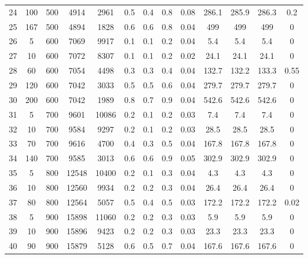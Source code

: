 \documentclass[11pt]{article}
\begin{document}
\begin{landscape}
\begin{longtable}[c]{ccccc|cccc|cccc}
			\rowcolor[HTML]{EFEFEF} 
			24 & 100 & 500 & 4914  & 2961  & 0.5 & 0.4 & 0.8 & 0.08 & 286.1 & 285.9 & 286.3 & 0.2  \\
			\rowcolor[HTML]{EFEFEF} 
			25 & 167 & 500 & 4894  & 1828  & 0.6 & 0.6 & 0.8 & 0.04 & 499   & 499   & 499   & 0    \\
			26 & 5   & 600 & 7069  & 9917  & 0.1 & 0.1 & 0.2 & 0.04 & 5.4   & 5.4   & 5.4   & 0    \\
			27 & 10  & 600 & 7072  & 8307  & 0.1 & 0.1 & 0.2 & 0.02 & 24.1  & 24.1  & 24.1  & 0    \\
			28 & 60  & 600 & 7054  & 4498  & 0.3 & 0.3 & 0.4 & 0.04 & 132.7 & 132.2 & 133.3 & 0.55 \\
			29 & 120 & 600 & 7042  & 3033  & 0.5 & 0.5 & 0.6 & 0.04 & 279.7 & 279.7 & 279.7 & 0    \\
			30 & 200 & 600 & 7042  & 1989  & 0.8 & 0.7 & 0.9 & 0.04 & 542.6 & 542.6 & 542.6 & 0    \\
			\rowcolor[HTML]{EFEFEF} 
			31 & 5   & 700 & 9601  & 10086 & 0.2 & 0.1 & 0.2 & 0.03 & 7.4   & 7.4   & 7.4   & 0    \\
			\rowcolor[HTML]{EFEFEF} 
			32 & 10  & 700 & 9584  & 9297  & 0.2 & 0.1 & 0.2 & 0.03 & 28.5  & 28.5  & 28.5  & 0    \\
			\rowcolor[HTML]{EFEFEF} 
			33 & 70  & 700 & 9616  & 4700  & 0.4 & 0.3 & 0.5 & 0.04 & 167.8 & 167.8 & 167.8 & 0    \\
			\rowcolor[HTML]{EFEFEF} 
			34 & 140 & 700 & 9585  & 3013  & 0.6 & 0.6 & 0.9 & 0.05 & 302.9 & 302.9 & 302.9 & 0    \\
			35 & 5   & 800 & 12548 & 10400 & 0.2 & 0.1 & 0.3 & 0.04 & 4.3   & 4.3   & 4.3   & 0    \\
			36 & 10  & 800 & 12560 & 9934  & 0.2 & 0.2 & 0.3 & 0.04 & 26.4  & 26.4  & 26.4  & 0    \\
			37 & 80  & 800 & 12564 & 5057  & 0.5 & 0.4 & 0.5 & 0.03 & 172.2 & 172.2 & 172.2 & 0.02 \\
			\rowcolor[HTML]{EFEFEF} 
			38 & 5   & 900 & 15898 & 11060 & 0.2 & 0.2 & 0.3 & 0.03 & 5.9   & 5.9   & 5.9   & 0    \\
			\rowcolor[HTML]{EFEFEF} 
			39 & 10  & 900 & 15896 & 9423  & 0.2 & 0.2 & 0.3 & 0.03 & 23.3  & 23.3  & 23.3  & 0    \\
			\rowcolor[HTML]{EFEFEF} 
			40 & 90  & 900 & 15879 & 5128  & 0.6 & 0.5 & 0.7 & 0.04 & 167.6 & 167.6 & 167.6 & 0   
	\end{longtable}
\end{landscape}
\end{document}
